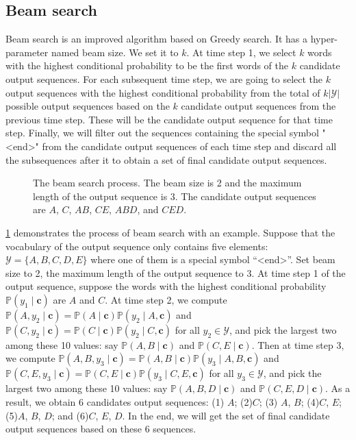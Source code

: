 \subsection{Beam search}\label{subsec:beam-search}

Beam search is an improved algorithm based on Greedy search. It has a hyper-parameter named beam size. We set it to $k$. At time step 1, we select $k$ words with the highest conditional probability to be the first words of the $k$ candidate output sequences. For each subsequent time step, we are going to select the $k$ output sequences with the highest conditional probability from the total of $k\left|\mathcal{Y}\right|$ possible output sequences based on the $k$ candidate output sequences from the previous time step. These will be the candidate output sequence for that time step. Finally, we will filter out the sequences containing the special symbol "<end>" from the candidate output sequences of each time step and discard all the subsequences after it to obtain a set of final candidate output sequences.

\begin{figure}[hpt]
    \centering
    
    \caption{The beam search process. The beam size is 2 and the maximum length of the output sequence is 3. The candidate output sequences are $A$, $C$, $AB$, $CE$, $ABD$, and $CED$. }
    \label{fig:beam_search}
\end{figure}

\cref{fig:beam_search} demonstrates the process of beam search with an example. Suppose that the vocabulary of the output sequence only contains five elements: $\mathcal{Y} = \{A, B, C, D, E\}$ where one of them is a special symbol “<end>”. Set beam size to 2, the maximum length of the output sequence to 3. At time step 1 of the output sequence, suppose the words with the highest conditional probability $\mathbb{P}(y_1 \mid \boldsymbol{c})$ are $A$ and $C$. At time step 2, we compute $\mathbb{P}(A, y_2 \mid \boldsymbol{c}) = \mathbb{P}(A \mid \boldsymbol{c})\mathbb{P}(y_2 \mid A, \boldsymbol{c})$ and $\mathbb{P}(C, y_2 \mid \boldsymbol{c}) = \mathbb{P}(C \mid \boldsymbol{c})\mathbb{P}(y_2 \mid C, \boldsymbol{c})$ for all $y_2 \in \mathcal{Y}$, and pick the largest two among these 10 values: say $\mathbb{P}(A, B \mid \boldsymbol{c})$ and $\mathbb{P}(C, E \mid \boldsymbol{c})$. Then at time step 3, we compute $\mathbb{P}(A, B, y_3 \mid \boldsymbol{c}) = \mathbb{P}(A, B \mid \boldsymbol{c})\mathbb{P}(y_3 \mid A, B, \boldsymbol{c})$ and $\mathbb{P}(C, E, y_3 \mid \boldsymbol{c}) = \mathbb{P}(C, E \mid \boldsymbol{c})\mathbb{P}(y_3 \mid C, E, \boldsymbol{c})$ for all $y_3 \in \mathcal{Y}$, and pick the largest two among these 10 values: say $\mathbb{P}(A, B, D \mid \boldsymbol{c})$ and $\mathbb{P}(C, E, D \mid  \boldsymbol{c})$. As a result, we obtain 6 candidates output sequences: (1) $A$; (2)$C$; (3) $A$, $B$; (4)$C$, $E$; (5)$A$, $B$, $D$; and (6)$C$, $E$, $D$. In the end, we will get the set of final candidate output sequences based on these 6 sequences.

